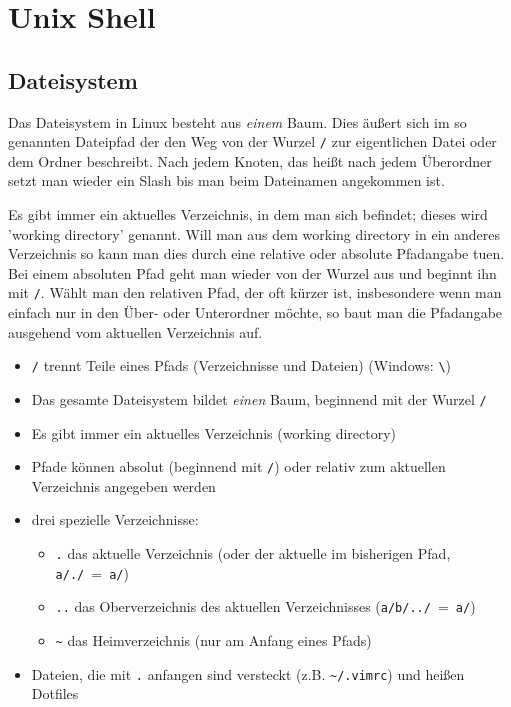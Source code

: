 \chapter{Unix Shell}
\section{Dateisystem}
Das Dateisystem in Linux besteht aus \emph{einem} Baum.
Dies äußert sich im so genannten Dateipfad der den Weg von der Wurzel \texttt{/} zur eigentlichen Datei oder dem Ordner beschreibt.
Nach jedem Knoten, das heißt nach jedem Überordner setzt man wieder ein Slash bis man beim Dateinamen angekommen ist.

Es gibt immer ein aktuelles Verzeichnis, in dem man sich befindet; dieses wird 'working directory' genannt.
Will man aus dem working directory in ein anderes Verzeichnis so kann man dies durch eine relative oder absolute Pfadangabe tuen.
Bei einem absoluten Pfad geht man wieder von der Wurzel aus und beginnt ihn mit \texttt{/}.
Wählt man den relativen Pfad, der oft kürzer ist, insbesondere wenn man einfach nur in den Über- oder Unterordner möchte, so baut man die Pfadangabe ausgehend vom aktuellen Verzeichnis auf.

\begin{itemize}
  \item \texttt{/} trennt Teile eines Pfads (Verzeichnisse und Dateien) (Windows: \texttt{\textbackslash})
  \item Das gesamte Dateisystem bildet \emph{einen} Baum, beginnend mit der Wurzel \texttt{/}
  \item Es gibt immer ein aktuelles Verzeichnis (working directory)
  \item Pfade können absolut (beginnend mit \texttt{/}) oder relativ zum aktuellen Verzeichnis angegeben werden
  \item drei spezielle Verzeichnisse:
    \begin{itemize}
      \item \texttt{.} das aktuelle Verzeichnis (oder der aktuelle im bisherigen Pfad, \texttt{a/./}~=~\texttt{a/})
      \item \texttt{..} das Oberverzeichnis des aktuellen Verzeichnisses (\texttt{a/b/../}~=~\texttt{a/})
      \item \texttt{\textasciitilde} das Heimverzeichnis (nur am Anfang eines Pfads)
    \end{itemize}
  \item Dateien, die mit \texttt{.} anfangen sind versteckt (z.B. \texttt{\textasciitilde/.vimrc}) und heißen Dotfiles
\end{itemize}

